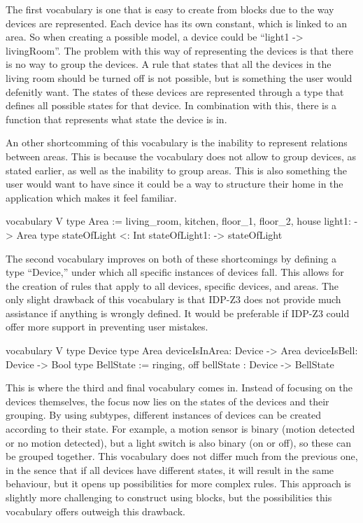 \documentclass[11pt,a4paper]{report}
\begin{document}
The first vocabulary is one that is easy to create from blocks due to the way devices are represented. Each device has its own constant, which is linked to an area. So when creating a possible model, a device could be ``light1 -> livingRoom''. The problem with this way of representing the devices is that there is no way to group the devices. A rule that states that all the devices in the living room should be turned off is not possible, but is something the user would defenitly want. The states of these devices are represented through a type that defines all possible states for that device. In combination with this, there is a function that represents what state the device is in. 

An other shortcomming of this vocabulary is the inability to represent relations between areas. This is because the vocabulary does not allow to group devices, as stated earlier, as well as the inability to group areas. This is also something the user would want to have since it could be a way to structure their home in the application which makes it feel familiar.
\begin{idplisting}
vocabulary V {
    type Area := {living_room, kitchen, floor_1, floor_2, house}
    light1: -> Area
    type stateOfLight <: Int
    stateOfLight1: -> stateOfLight
}
\end{idplisting}
The second vocabulary improves on both of these shortcomings by defining a type ``Device,'' under which all specific instances of devices fall. This allows for the creation of rules that apply to all devices, specific devices, and areas. The only slight drawback of this vocabulary is that IDP-Z3 does not provide much assistance if anything is wrongly defined. It would be preferable if IDP-Z3 could offer more support in preventing user mistakes.
\begin{idplisting}
vocabulary V {
    type Device
    type Area
    deviceIsInArea: Device -> Area
    deviceIsBell: Device -> Bool
    type BellState := {ringing, off}
    bellState : Device -> BellState 
}
\end{idplisting}
This is where the third and final vocabulary comes in. Instead of focusing on the devices themselves, the focus now lies on the states of the devices and their grouping. By using subtypes, different instances of devices can be created according to their state. For example, a motion sensor is binary (motion detected or no motion detected), but a light switch is also binary (on or off), so these can be grouped together. This vocabulary does not differ much from the previous one, in the sence that if all devices have different states, it will result in the same behaviour, but it opens up possibilities for more complex rules. This approach is slightly more challenging to construct using blocks, but the possibilities this vocabulary offers outweigh this drawback.
\end{document}
